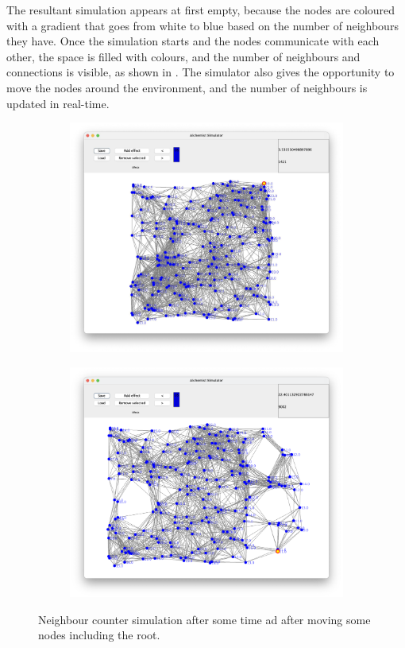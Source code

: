 The resultant simulation appears at first empty, because the nodes are coloured with a gradient that goes from white to
blue based on the number of neighbours they have.
Once the simulation starts and the nodes communicate with each other, the space is filled with colours, and the number of
neighbours and connections is visible, as shown in .
The simulator also gives the opportunity to move the nodes around the environment, and the number of neighbours is updated
in real-time.

\begin{figure}[ht!]
    \centering
    \begin{subfigure}[b]{0.49\textwidth}
        \centering
        \includegraphics[width=\textwidth]{figures/neighborCounter}
    \end{subfigure}
    \begin{subfigure}[b]{0.49\textwidth}
        \centering
        \includegraphics[width=\textwidth]{figures/neighborCounterMoved}
    \end{subfigure}
    \caption{Neighbour counter simulation after some time ad after moving some nodes including the root.}
    \label{fig:neighbour-counter}
\end{figure}

